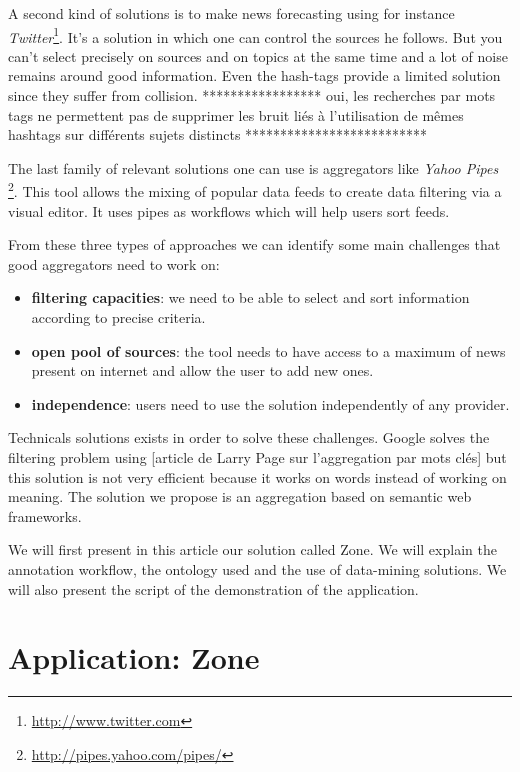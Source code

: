 \documentclass{llncs}
\begin{document}
A second kind of solutions is to make news forecasting using for instance \textsl{Twitter}\footnote{\url{http://www.twitter.com}}. It's a solution in which one can control the sources he follows. But you can't select precisely on sources and on topics at the same time and a lot of noise remains around good information. Even the hash-tags provide a limited solution since they suffer from collision.  
***************** oui, les recherches par mots tags ne permettent pas de supprimer les bruit liés à l'utilisation de mêmes hashtags sur différents sujets distincts **************************


The last family of relevant solutions one can use is aggregators like \textsl{Yahoo Pipes} \footnote{\url{http://pipes.yahoo.com/pipes/}}. This tool allows the mixing of popular data feeds to create data filtering via a visual editor. It uses pipes as workflows which will help users sort feeds.

From these three types of approaches we can identify some main challenges that good aggregators need to work on:
\begin{itemize}
  \item \textbf{filtering capacities}: we need to be able to select and sort information according to precise criteria.
  \item \textbf{open pool of sources}: the tool needs to have access to a maximum of news present on internet and allow the user to add new ones.
  \item \textbf{independence}: users need to use the solution independently of any provider.
\end{itemize}

Technicals solutions exists in order to solve these challenges. Google solves the filtering problem using [article de Larry Page sur l'aggregation par mots clés] but this solution is not very efficient because it works on words instead of working on meaning. The solution we propose is an aggregation based on semantic web frameworks. 

We will first present in this article our solution called Zone. We will explain the annotation workflow, the ontology used and the use of data-mining solutions. We will also present the script of the demonstration of the application.

%
\section{Application: Zone}
\end{document}
